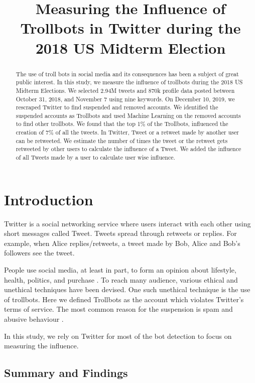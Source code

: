 \documentclass[letterpaper]{article}
\title{Measuring the Influence of Trollbots in Twitter during the 2018 US Midterm Election}
\begin{document}
\maketitle

\begin{abstract}
    The use of troll bots in social media and its consequences has been a subject of great public interest. In this study, 
    we measure the influence of trollbots during 
    the 2018 US Midterm Elections. We selected 2.94M tweets and 870k 
    profile data posted between October 31, 2018, and November 7 using nine keywords. On December 10, 2019, 
    we rescraped Twitter to find suspended and removed accounts. We identified the suspended accounts 
    as Trollbots and used Machine Learning on the removed 
    accounts to find other trollbots. We found that the top 1\% of the Trollbots, influenced the creation of 7\% of all the tweets.
    In Twitter, Tweet or a retweet made by another user can be retweeted.
    We estimate the number of times the tweet or the retweet 
    gets retweeted by other users to calculate the influence of a Tweet.
    We added the influence of all Tweets made by a user to calculate user wise influence.\end{abstract}

\section{Introduction}
\label{sec:introduction}

Twitter is a social networking service where users interact with each other using short messages called Tweet. 
Tweets spread through retweets or replies. For example, when Alice replies/retweets, a tweet made 
by Bob, Alice and Bob's followers see the tweet. \par

People use social media, at least in part, to form an opinion about lifestyle, health, politics, and purchase 
\cite{varol2017early}. To reach many audience, various ethical and unethical 
techniques have been devised. 
One such unethical technique is the use of trollbots. Here we defined Trollbots as the account which violates
Twitter's terms of service. The most common reason for the suspension is spam and abusive behaviour 
\cite{twitter}. \par

In this study, we rely on Twitter for most of the bot detection to focus on measuring the influence.

\subsection{Summary and Findings}
\end{document}
